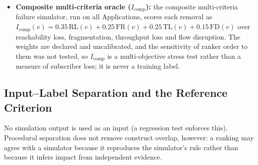 \documentclass[preprint,3p]{elsarticle}
\begin{document}
\begin{itemize}
    \item \textbf{Composite multi-criteria oracle ($I_{\text{comp}}$):} the composite multi-criteria failure simulator, run on all Applications, scores each removal as $I_{\text{comp}}(v) = 0.35\,\text{RL}(v) + 0.25\,\text{FR}(v) + 0.25\,\text{TL}(v) + 0.15\,\text{FD}(v)$ over reachability loss, fragmentation, throughput loss and flow disruption. The weights are declared and uncalibrated, and the sensitivity of ranker order to them was not tested, so $I_{\text{comp}}$ is a multi-objective stress test rather than a measure of subscriber loss; it is never a training label.
\end{itemize}

\subsection{Input--Label Separation and the Reference Criterion}
\label{sec:4.4}

No simulation output is used as an input (a regression test enforces this). Procedural separation does not remove construct overlap, however: a ranking may agree with a simulator because it reproduces the simulator's rule rather than because it infers impact from independent evidence.
\end{document}
